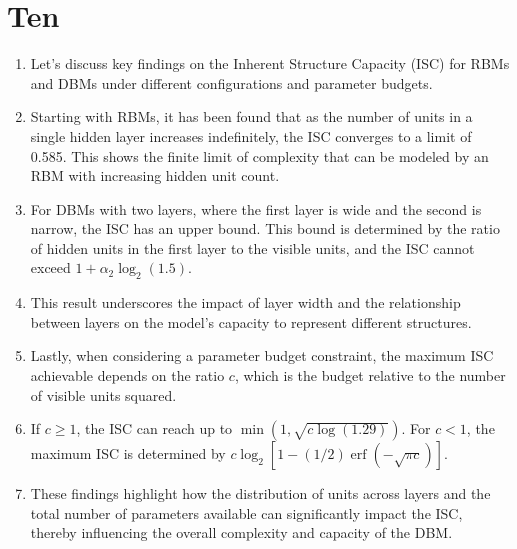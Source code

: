 \documentclass{article}
\begin{document}
\section*{Ten}
\begin{enumerate}
    \item Let's discuss key findings on the Inherent Structure Capacity (ISC) for RBMs and DBMs under different configurations and parameter budgets.
    \item Starting with RBMs, it has been found that as the number of units in a single hidden layer increases indefinitely, the ISC converges to a limit of 0.585. This shows the finite limit of complexity that can be modeled by an RBM with increasing hidden unit count.
    \item For DBMs with two layers, where the first layer is wide and the second is narrow, the ISC has an upper bound. This bound is determined by the ratio of hidden units in the first layer to the visible units, and the ISC cannot exceed \(1 + \alpha_2 \log_2(1.5)\).
    \item This result underscores the impact of layer width and the relationship between layers on the model's capacity to represent different structures.
    \item Lastly, when considering a parameter budget constraint, the maximum ISC achievable depends on the ratio \(c\), which is the budget relative to the number of visible units squared.
    \item If \(c \geq 1\), the ISC can reach up to \( \min(1, \sqrt{c \log(1.29)}) \). For \(c < 1\), the maximum ISC is determined by \(c \log_2[1 - (1/2) \operatorname{erf}(-\sqrt{\pi c})]\).
    \item These findings highlight how the distribution of units across layers and the total number of parameters available can significantly impact the ISC, thereby influencing the overall complexity and capacity of the DBM.
\end{enumerate}
\end{document}
